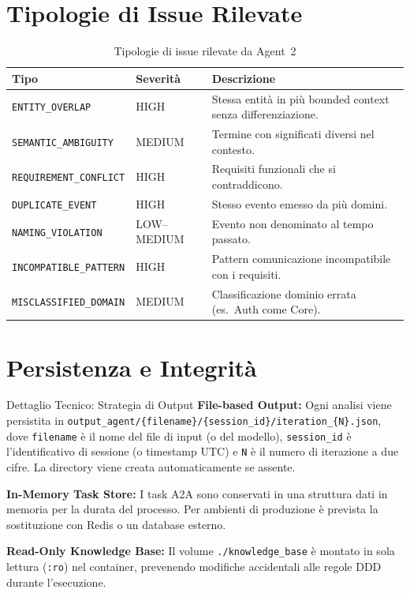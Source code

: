\documentclass[12pt,a4paper]{report}
\begin{document}
\section{Tipologie di Issue Rilevate}

\begin{table}[H]
\centering
\renewcommand{\arraystretch}{1.3}
\begin{tabular}{llp{7cm}}
\toprule
\textbf{Tipo} & \textbf{Severità} & \textbf{Descrizione} \\
\midrule
\texttt{ENTITY\_OVERLAP}       & HIGH   & Stessa entità in più bounded context senza differenziazione. \\
\texttt{SEMANTIC\_AMBIGUITY}   & MEDIUM & Termine con significati diversi nel contesto. \\
\texttt{REQUIREMENT\_CONFLICT} & HIGH   & Requisiti funzionali che si contraddicono. \\
\texttt{DUPLICATE\_EVENT}      & HIGH   & Stesso evento emesso da più domini. \\
\texttt{NAMING\_VIOLATION}     & LOW--MEDIUM & Evento non denominato al tempo passato. \\
\texttt{INCOMPATIBLE\_PATTERN} & HIGH   & Pattern comunicazione incompatibile con i requisiti. \\
\texttt{MISCLASSIFIED\_DOMAIN} & MEDIUM & Classificazione dominio errata (es.\ Auth come Core). \\
\bottomrule
\end{tabular}
\caption{Tipologie di issue rilevate da Agent~2}
\label{tab:issue-types}
\end{table}

\section{Persistenza e Integrità}

\begin{technicalbox}{Dettaglio Tecnico: Strategia di Output}
\textbf{File-based Output:} Ogni analisi viene persistita in
\texttt{output\_agent/\{filename\}/\{session\_id\}/iteration\_\{N\}.json},
dove \texttt{filename} è il nome del file di input (o del modello),
\texttt{session\_id} è l'identificativo di sessione (o timestamp UTC)
e \texttt{N} è il numero di iterazione a due cifre.
La directory viene creata automaticamente se assente.

\textbf{In-Memory Task Store:} I task A2A sono conservati in
una struttura dati in memoria per la durata del processo. Per ambienti
di produzione è prevista la sostituzione con Redis o un database esterno.

\textbf{Read-Only Knowledge Base:} Il volume \texttt{./knowledge\_base}
è montato in sola lettura (\texttt{:ro}) nel container, prevenendo
modifiche accidentali alle regole DDD durante l'esecuzione.
\end{technicalbox}
\end{document}
